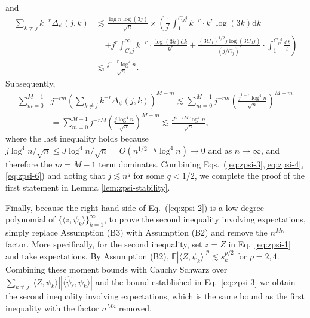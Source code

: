 \documentclass[11pt,a4paper]{article}
\renewcommand{\hat}{\widehat}
\theoremstyle{definition}
\theoremstyle{plain}
\theoremstyle{remark}
\newcommand{\ud}{\mathrm d}
\newcommand{\pd}[1]{
	{ \color{blue} PD: #1}
}
\begin{document}
and 
\begin{align}
\sum_{k\neq j}k^{-r}\Delta_\psi(j,k) &\lesssim  \frac{\log n\log(3j)}{\sqrt{n}}\times \left( \frac{1}{j^{r}}\int_1^{C_J j}k^{-r}\cdot k^{r}\log(3k)\ud k \right.\nonumber\\
&\;\;\;\;\left.+ j^{r}\int_{C_J j}^{\infty}k^{-r}\cdot\frac{\log(3k)\ud k}{k^{r}} + \frac{(3C_J)^{1/2} j\log(3C_Jj)}{(j/C_j)^{r}}\cdot \int_1^{C_j j}\frac{\ud t}{t}\right)\nonumber\\
&\lesssim \frac{j^{1-r}\log^{4}n}{\sqrt{n}}.\label{eq:zpsi-5}
\end{align}
Subsequently,
\begin{align}
\sum_{m=0}^{M-1}& j^{-rm}\left(\sum_{k\neq j}k^{-r}\Delta_\psi(j,k)\right)^{M-m}
\lesssim \sum_{m=0}^{M-1}j^{-rm}\left(\frac{j^{1-r}\log^4 n}{\sqrt{n}}\right)^{M-m}\nonumber\\
&= \sum_{m=0}^{M-1}j^{-rM}\left(\frac{j\log^4 n}{\sqrt{n}}\right)^{M-m} \lesssim \frac{J^{1-rM}\log^4 n}{\sqrt{n}},
\label{eq:zpsi-6}
\end{align}
where the last inequality holds because $j\log^4n/\sqrt{n}\leq J\log^4 n/\sqrt{n} = O(n^{1/2-q}\log^4 n)\to 0$ and as $n\to\infty$, and therefore the $m=M-1$ term dominates.
Combining Eqs.~(\ref{eq:zpsi-3},\ref{eq:zpsi-4},\ref{eq:zpsi-6}) and noting that $j\lesssim n^q$ for some $q<1/2$, we complete the proof of the first statement in Lemma \ref{lem:zpsi-stability}.

Finally, because the right-hand side of Eq.~(\ref{eq:zpsi-2}) is a low-degree polynomial of $\{\langle z,\psi_k\rangle\}_{k=1}^{\infty}$,
to prove the second inequality involving expectations, simply replace Assumption (B3) with Assumption (B2) and remove the $n^{M\kappa}$ factor. 
More specifically, {for the second inequality, set $z = Z$ in Eq.~\eqref{eq:zpsi-1} and take expectations. By Assumption (B2), $\mathbb{E}\left| \langle Z, \psi_k \rangle \right|^p \lesssim s^{p/2}_k$ for $p=2,4$. Combining these moment bounds with Cauchy Schwarz over $\sum_{k \neq j} \left| \langle Z, \psi_k \rangle \right| | \langle \hat\psi_\ell, \psi_k \rangle |$ and the bound established in Eq.~\eqref{eq:zpsi-3} we obtain the second inequality involving expectations, which is the same bound as the first inequality with the factor $n^{M\kappa}$ removed.}
\end{document}
